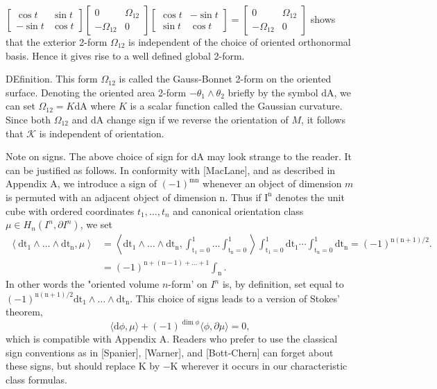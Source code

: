 \documentclass[10pt]{article}
\begin{document}
$\left[\begin{array}{cc}\cos t & \sin t \\ -\sin t & \cos t\end{array}\right]\left[\begin{array}{cc}0 & \Omega_{12} \\ -\Omega_{12} & 0\end{array}\right]\left[\begin{array}{cc}\cos t & -\sin t \\ \sin t & \cos t\end{array}\right]=\left[\begin{array}{cc}0 & \Omega_{12} \\ -\Omega_{12} & 0\end{array}\right]$ shows that the exterior 2-form $\Omega_{12}$ is independent of the choice of oriented orthonormal basis. Hence it gives rise to a well defined global 2-form.

DEfinition. This form $\Omega_{12}$ is called the Gauss-Bonnet 2-form on the oriented surface. Denoting the oriented area 2-form $-\theta_{1} \wedge \theta_{2}$ briefly by the symbol $\mathrm{dA}$, we can set $\Omega_{12}=K \mathrm{dA}$ where $K$ is a scalar function called the Gaussian curvature. Since both $\Omega_{12}$ and $\mathrm{dA}$ change sign if we reverse the orientation of $M$, it follows that $\mathcal{K}$ is independent of orientation.

Note on signs. The above choice of sign for $\mathrm{dA}$ may look strange to the reader. It can be justified as follows. In conformity with [MacLane], and as described in Appendix $\mathrm{A}$, we introduce a sign of $(-1)^{\mathrm{mn}}$ whenever an object of dimension $m$ is permuted with an adjacent object of dimension $\mathrm{n}$. Thus if $\mathrm{I}^{\mathrm{n}}$ denotes the unit cube with ordered coordinates $t_{1}, \ldots, t_{n}$ and canonical orientation class $\mu \in H_{n}\left(I^{n}, \partial I^{n}\right)$, we set
$$
\begin{aligned}
\left\langle\mathrm{dt}_{1} \wedge \ldots \wedge \mathrm{dt}_{\mathrm{n}}, \mu\right\rangle &=\left\langle\mathrm{dt}_{1} \wedge \ldots \wedge \mathrm{dt}_{\mathrm{n}}, \int_{\mathrm{t}_{1}=0}^{1} \ldots \int_{\mathrm{t}_{\mathrm{n}}=0}^{1}\right\rangle \int_{\mathrm{t}_{1}=0}^{1} \mathrm{dt}_{1} \cdots \int_{\mathrm{t}_{\mathrm{n}}=0}^{1} \mathrm{dt}_{\mathrm{n}}=(-1)^{\mathrm{n}(\mathrm{n}+1) / 2} . \\
&=(-1)^{\mathrm{n}+(\mathrm{n}-1)+\ldots+1} \int_{\mathrm{n}} .
\end{aligned}
$$
In other words the "oriented volume $n$-form' on $I^{n}$ is, by definition, set equal to $(-1)^{\mathrm{n}(\mathrm{n}+1) / 2} \mathrm{dt}_{1} \wedge \ldots \wedge \mathrm{dt}_{\mathrm{n}}$. This choice of signs leads to a version of Stokes' theorem,
$$
\langle\mathrm{d} \phi, \mu\rangle+(-1)^{\operatorname{dim} \phi}\langle\phi, \partial \mu\rangle=0,
$$
which is compatible with Appendix A. Readers who prefer to use the classical sign conventions as in [Spanier], [Warner], and [Bott-Chern] can forget about these signs, but should replace $\mathrm{K}$ by $-\mathrm{K}$ wherever it occurs in our characteristic class formulas.
\end{document}
